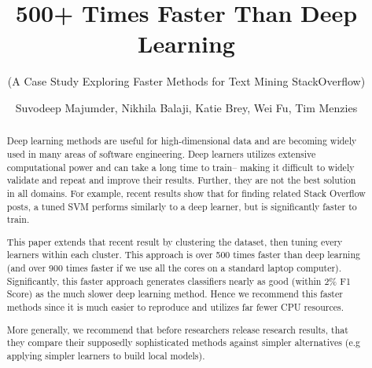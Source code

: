 \documentclass[sigconf]{acmart}
\theoremstyle{break}
\begin{document}
\title{ 500+ Times Faster Than Deep Learning} 
\subtitle{(A Case Study Exploring Faster   Methods for Text Mining StackOverflow)}


\author{Suvodeep Majumder, Nikhila Balaji, Katie Brey, Wei Fu, Tim Menzies}  


\renewcommand{\shortauthors}{S. Majumder et al.}



 
\begin{abstract}
 Deep learning methods are 
useful for  high-dimensional data and are becoming widely used in many areas of software engineering. 
Deep learners utilizes extensive computational power and can take a  long time to train-- making it difficult to widely validate and repeat and improve their results.
Further, they are not the best solution in all domains. For example, recent results
show that for finding related   Stack Overflow posts, a tuned SVM performs similarly to a deep learner, but is significantly faster to train. 

This paper extends that recent result by   clustering the dataset, then    tuning every learners within each cluster. This approach is over  500 times faster than  deep learning (and over 900 times faster if we use all the cores on a standard laptop computer). Significantly, this faster approach generates classifiers   nearly as good (within 2\% F1 Score) as the much slower deep learning method.
Hence we recommend this faster methods since it is much easier to reproduce and utilizes far fewer CPU resources. 

More generally, we recommend that before researchers release research results, that they compare their supposedly sophisticated methods against simpler alternatives
(e.g applying simpler learners to build local models).
\end{abstract}
\end{document}

